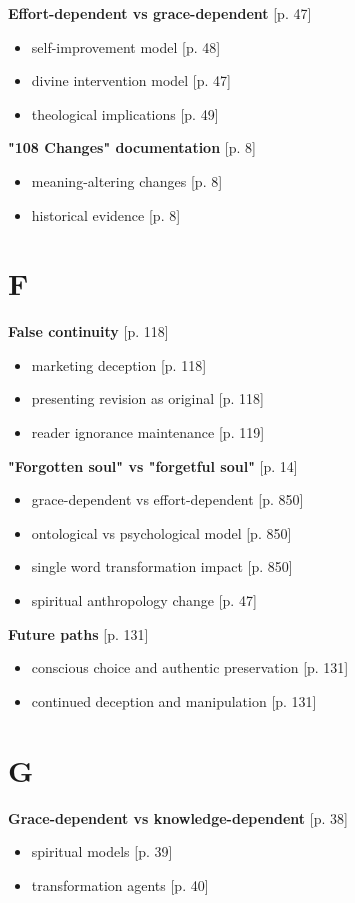 \documentclass[11pt,twoside]{book}
\begin{document}
\textbf{\textbf{Effort-dependent vs grace-dependent}} {[}p. 47]
\begin{itemize}
\item self-improvement model [p. 48]
\item divine intervention model [p. 47]
\item theological implications [p. 49]
\end{itemize}

\textbf{\textbf{"108 Changes" documentation}} {[}p. 8]
\begin{itemize}
\item meaning-altering changes [p. 8]
\item historical evidence [p. 8]
\end{itemize}
\section*{F}
\label{sec:org9979851}

\textbf{\textbf{False continuity}} {[}p. 118]
\begin{itemize}
\item marketing deception [p. 118]
\item presenting revision as original [p. 118]
\item reader ignorance maintenance [p. 119]
\end{itemize}

\textbf{\textbf{"Forgotten soul" vs "forgetful soul"}} {[}p. 14]
\begin{itemize}
\item grace-dependent vs effort-dependent [p. 850]
\item ontological vs psychological model [p. 850]
\item single word transformation impact [p. 850]
\item spiritual anthropology change [p. 47]
\end{itemize}

\textbf{\textbf{Future paths}} {[}p. 131]
\begin{itemize}
\item conscious choice and authentic preservation [p. 131]
\item continued deception and manipulation [p. 131]
\end{itemize}
\section*{G}
\label{sec:org5348190}

\textbf{\textbf{Grace-dependent vs knowledge-dependent}} {[}p. 38]
\begin{itemize}
\item spiritual models [p. 39]
\item transformation agents [p. 40]
\end{itemize}
\end{document}
